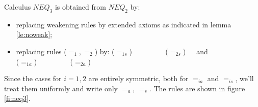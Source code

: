 \begin{DEFINITION} Calculus $NEQ_3$ is obtained from $NEQ_2$ by:
\begin{itemize}\MyLPar
\item replacing weakening rules by extended axioms as indicated in lemma \ref{le:noweak};
\item replacing rules  ($=_1, =_2$) by:
 ($=_{1s}$)
\label{ru:K12s} \ \ \ \ \ \ \ \ 
 ($=_{2s}$)\ \ \
and \\
\PROOFRULE{s=t,\Gamma_t^x,\Seq\Delta}{s=t,\Gamma_s^x,\Seq\Delta} ($=_{1a}$)
\label{ru:K12a} \ \ \ \ \ \ \ \ 
 ($=_{2a}$)\ \ \
%
\end{itemize}
\end{DEFINITION}
\noindent
Since the cases for $i=1,2$ are entirely symmetric, both for 
 $=_{ia}$ and $=_{is}$, we'll treat them uniformly and write only $=_a$,
 $=_s$.
The rules are shown in figure \ref{fi:neq3}.

